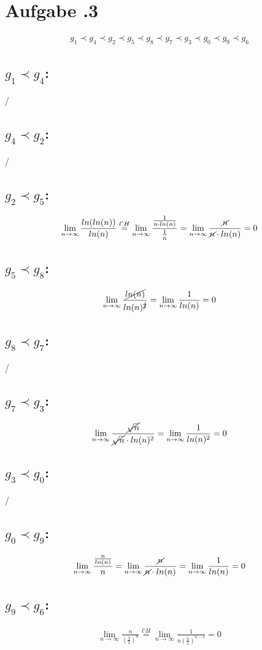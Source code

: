 \newpage
\section*{Aufgabe \bn.3}
\begin{align*}
g_1\prec g_4\prec g_2\prec g_5\prec g_8\prec g_7\prec g_3\prec g_0\prec g_9\prec g_6
\end{align*}
\subsection*{$g_1 \prec g_4$:}
/
\subsection*{$g_4 \prec g_2$:}
/
\subsection*{$g_2 \prec g_5$:}
\begin{align*}
  \lim_{n \rightarrow \infty} \frac{ ln(ln(n)) }{ ln(n) } \overset{l'H}{=} \lim_{n \rightarrow \infty} \frac{ \frac{ 1 }{ n\cdot ln(n) }  }{ \frac{ 1 }{ n }  } = \lim_{n \rightarrow \infty} \frac{ \cancel{n} }{ \cancel{n}\cdot ln(n) } = 0  
\end{align*}
\subsection*{$g_5 \prec g_8$:}
\begin{align*}
  \lim_{n \rightarrow \infty} \frac{ \cancel{ln(n)} }{ ln(n)^{\cancel{2}} } = \lim_{n \rightarrow \infty} \frac{ 1 }{ ln(n) } = 0
\end{align*}
\subsection*{$g_8 \prec g_7$:}
/
\subsection*{$g_7 \prec g_3$:}
\begin{align*}
  \lim_{n \rightarrow \infty} \frac{ \cancel{\sqrt{n}} }{ \cancel{\sqrt{n}}\cdot ln(n)^2 } = \lim_{n \rightarrow \infty} \frac{ 1 }{ ln(n)^2 } = 0
\end{align*}
\subsection*{$g_3 \prec g_0$:}
/
\subsection*{$g_0 \prec g_9$:}
\begin{align*}
  \lim_{n \rightarrow \infty} \frac{ \frac{ n }{ ln(n) }  }{ n } = \lim_{n \rightarrow \infty} \frac{ \cancel{n} }{ \cancel{n}\cdot ln(n) } = \lim_{n \rightarrow \infty} \frac{ 1 }{ ln(n) } = 0
\end{align*}
\subsection*{$g_9 \prec g_6$:}
\begin{align*}
  \lim_{n \rightarrow \infty} \frac{ n }{ \left(\frac{ 3 }{ 2 }  \right)^{n} } \overset{l'H}{=} \lim_{n \rightarrow \infty} \frac{ 1 }{ n\left(\frac{ 3 }{ 2 }  \right)^{n-1} } = 0
\end{align*}
